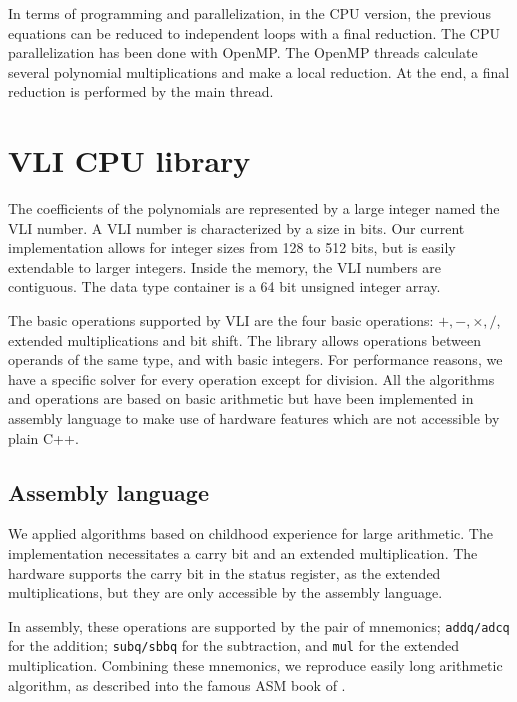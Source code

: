 \documentclass[oribibl]{llncs2e/llncs}
\begin{document}
In terms of  programming and parallelization, in the CPU version, the previous equations can be reduced to independent loops with a final reduction.
The CPU parallelization has been done with OpenMP. The OpenMP threads calculate several  polynomial multiplications and make a local reduction. At the end, a final reduction is performed  by the main thread.

\section{VLI  CPU library}

The coefficients of the polynomials are represented by a large integer named the VLI number.  A VLI number is characterized by a size in bits.
Our current implementation allows for integer sizes from 128 to 512 bits, but is easily extendable to larger integers.
Inside the memory, the VLI numbers are  contiguous. The data type container is a 64 bit unsigned integer array.

The basic operations supported by VLI are the four basic operations: $+,-,\times, /$, extended multiplications and bit shift. The library allows  operations between operands of the same type, and with basic  integers. For performance reasons, we have a specific solver for every operation except  for division.
All the algorithms and operations are based on basic arithmetic but have been implemented in assembly language to make use of hardware features which are not accessible by plain C++.

\subsection{Assembly language}

We applied algorithms based on childhood  experience for large arithmetic. The implementation necessitates a carry bit and an extended multiplication. The hardware supports
the carry bit in the status register, as the extended multiplications, but they are only accessible by the assembly language.

In assembly, these operations  are supported by the pair of mnemonics; \texttt{addq/adcq} for the addition; \texttt{subq/sbbq} for the subtraction, and \texttt{mul} for the extended multiplication.   
Combining these mnemonics, we reproduce easily long arithmetic algorithm, as described into the famous  ASM book of \cite{Hyde:2003:AAL:861534}. 
\end{document}
